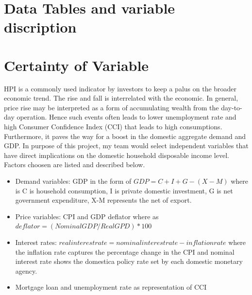 \documentclass[11pt]{article}
\begin{document}
\section{Data Tables and variable discription}\label{section-datatable}
\section{Certainty of Variable}\label{section-Certainty}
HPI is a commonly used indicator by investors to keep a palus on the broader economic trend. The rise and fall is interrelated with the economic. In general, price rise may be interpreted as a form of accumulating wealth from the day-to-day operation. Hence such events often leads to lower unemployment rate and high Consumer Confidence Index (CCI) that leads to high consumptions. Furthermore, it paves the way for a boost in the domestic aggregate demand and GDP. In purpose of this project, my team would select independent variables that have direct implications on the domestic household disposable income level. Factors choosen are listed and described below. 
\begin{itemize}
\item Demand variables: GDP in the form of \(GDP = C + I + G - (X-M)\) where is C is household consumption, I is private domestic investment, G is net government expenditure, X-M represents the net of export. 
\item Price variables: CPI and GDP deflator where as \(deflator = (Nominal GDP / Real GPD) * 100 \)
\item Interest rates: \(real interest rate = nominal interest rate - inflation rate\) where the inflation rate captures the percentage change in the CPI and nominal interest rate shows the domestica policy rate set by each domestic monetary agency. 
\item Mortgage loan and unemployment rate as representation of CCI
\end{itemize}     




\end{document}
